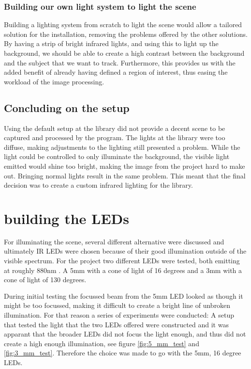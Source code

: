\subsubsection{Building our own light system to light the scene}
Building a lighting system from scratch to light the scene would allow a tailored solution for the installation, removing the problems offered by the other solutions. By having a strip of bright infrared lights, and using this to light up the background, we should be able to create a high contrast between the background and the subject that we want to track. Furthermore, this provides us with the added benefit of already having defined a region of interest, thus easing the workload of the image processing.

\subsection{Concluding on the setup}
Using the default setup at the library did not provide a decent scene to be captured and processed by the program. The lights at the library were too diffuse, making adjustments to the lighting still presented a problem. While the light could be controlled to only illuminate the background, the visible light emitted would shine too bright, making the image from the project hard to make out. Bringing normal lights result in the same problem. This meant that the final decision was to create a custom infrared lighting for the library.

\section{building the LEDs}
For illuminating the scene, several different alternative were discussed and ultimately IR LEDs were chosen  because of their good illumination outside of the visible spectrum. For the project two different LEDs were tested, both emitting at roughly 880nm \citep{5mm_led} \citep{3mm_led}. A 5mm with a cone of light of 16 degrees and a 3mm with a cone of light of 130 degrees.

During initial testing the focussed beam from the 5mm LED looked as though it might be too focussed, making it  difficult to create a bright line of unbroken illumination. For that reason a series of experiments were conducted: A setup that tested the light that the two LEDs offered were constructed and it was apparant that the broader LEDs did not focus the light enough, and thus did not create a high enough illumination, see figure \ref{fig:5_mm_test} and \ref{fig:3_mm_test}. Therefore the choice was made to go with the 5mm, 16 degree LEDs.

